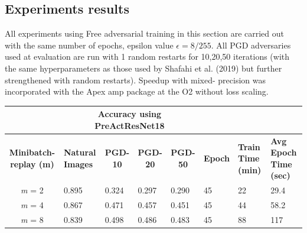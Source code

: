 \documentclass{article}
\begin{document}
\subsection{Experiments results}
All experiments using Free adversarial training in this section are carried out with the same number of epochs, epsilon value $\epsilon = 8/255$. All PGD adversaries used at
evaluation are run with 1 random restarts for 10,20,50 iterations (with the same hyperparameters as those
used by Shafahi et al. (2019) but further strengthened with random restarts). Speedup with mixed-
precision was incorporated with the Apex amp package at the O2 without loss scaling.
\begin{table}[hbt!]
\begin{tabular}{|c|l|l|l|l|l|l|p{2cm}|}
\hline
\multicolumn{1}{|l|}{{ }}        & \multicolumn{4}{c|}{{ \textbf{Accuracy using PreActResNet18}}}                                                                                                                                                                            & \multicolumn{3}{l|}{{ }}                                                                                                                                                       \\ \hline
{ \textbf{Minibatch-replay (m)}} & \multicolumn{1}{p{1.5cm}|}{{ \textbf{Natural Images}}} & \multicolumn{1}{c|}{{ \textbf{PGD-10}}} & \multicolumn{1}{c|}{{ \textbf{PGD-20}}} & \multicolumn{1}{c|}{{ \textbf{PGD-50}}} & \multicolumn{1}{c|}{{ \textbf{Epoch}}} & \multicolumn{1}{p{1.5cm}|}{{ \textbf{Train Time (min)}}} & \multicolumn{1}{p{1.5cm}|}{{ \textbf{Avg Epoch Time (sec)}}} \\ \hline
{ \textit{m} = 2}                & { 0.895}                                        & { 0.324}                                & { 0.297}                                & { 0.290}                                & { 45}                                  & { 22 }                               & { 29.4 }                                 \\ \hline
{ \textit{m} = 4}                & { 0.867}                                        & { 0.471}                                & { 0.457}                                & { 0.451}                                & { 45}                                  & { 44 }                               & { 58.2 }                                 \\ \hline
{ \textit{m} = 8}                & { 0.839}                                        & { 0.498}                                & { 0.486}                                & { 0.483}                                & { 45}                                  & { 88 }                               & { 117 }                                  \\ \hline

\end{tabular}
\end{table}
\end{document}
